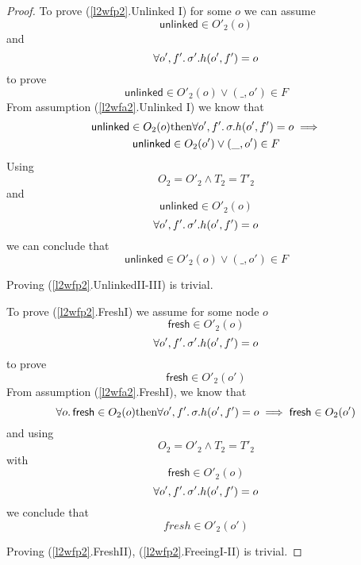 \begin{proof}
To prove (\ref{l2wfp2}.\textsf{Unlinked I}) for some $o$ we can assume
\[\mathsf{unlinked} \in O'_{2}(o) \] and 
\[\forall o',f' \ldotp \sigma'.h(o',f')= o\] to prove
\[ \mathsf{unlinked} \in O'_{2}(o) \lor (\_,o') \in F\]
From assumption (\ref{l2wfa2}.\textsf{Unlinked I})  we know that 
\begin{gather}\mathsf{unlinked} \in O_{2}(o) \text{then} \forall o',f' \ldotp \sigma.h(o',f') = o \implies \\ 
\mathsf{unlinked} \in O_{2}(o') \lor (\_,o') \in F \end{gather}
Using 
\[O_{2} = O'_{2} \land T_{2} = T'_{2}\] and 
\[\mathsf{unlinked} \in O'_{2}(o) \]
\[\forall o',f' \ldotp \sigma'.h(o',f')= o\] 
we can conclude that 
\[ \mathsf{unlinked} \in O'_{2}(o) \lor (\_,o') \in F\]

Proving (\ref{l2wfp2}.\textsf{UnlinkedII-III}) is trivial.

To prove (\ref{l2wfp2}.\textsf{FreshI}) we assume for some node $o$
\[\mathsf{fresh} \in O'_{2}(o) \]
\[\forall o',f'  \ldotp \sigma'.h(o',f') = o\]
to prove
\[ \mathsf{fresh} \in O'_{2}(o')\]
From assumption (\ref{l2wfa2}.\textsf{FreshI}), we know that 
\[ \forall o \ldotp \mathsf{fresh} \in O_{2}(o) \text{then} \forall o',f' \ldotp \sigma.h(o',f') = o \implies \mathsf{fresh} \in O_{2}(o') \]
and using 
\[ O_{2} = O'_{2} \land T_{2} = T'_{2} \] with 
\[ \mathsf{fresh} \in O'_{2}(o) \]
\[ \forall o',f'  \ldotp \sigma'.h(o',f') = o\]
we conclude that 
\[fresh \in O'_{2}(o')\]

Proving (\ref{l2wfp2}.\textsf{FreshII}), (\ref{l2wfp2}.\textsf{FreeingI-II}) is trivial.

\end{proof}
\newcommand{\newln}{\\&\quad\quad{}} 



